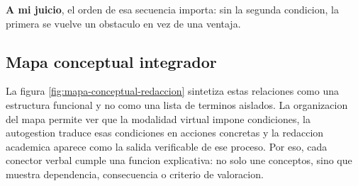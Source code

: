 \documentclass[
	spanish,
	letterpaper, oneside
]{article}
\begin{document}
\textbf{A mi juicio}, el orden de esa secuencia importa: sin la segunda condicion, la primera se vuelve un obstaculo en vez de una ventaja.

\subsection{Mapa conceptual integrador}

La figura \ref{fig:mapa-conceptual-redaccion} sintetiza estas relaciones como una estructura funcional y no como una lista de terminos aislados. La organizacion del mapa permite ver que la modalidad virtual impone condiciones, la autogestion traduce esas condiciones en acciones concretas y la redaccion academica aparece como la salida verificable de ese proceso. Por eso, cada conector verbal cumple una funcion explicativa: no solo une conceptos, sino que muestra dependencia, consecuencia o criterio de valoracion.
\end{document}
